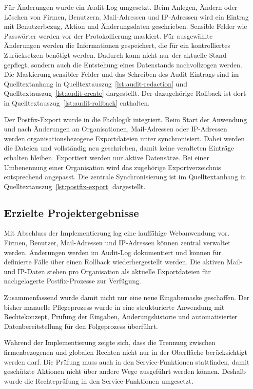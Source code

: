 Für Änderungen wurde ein Audit-Log umgesetzt. Beim Anlegen, Ändern
oder Löschen von Firmen, Benutzern, Mail-Adressen und IP-Adressen wird ein
Eintrag mit Benutzerbezug, Aktion und Änderungsdaten geschrieben. Sensible
Felder wie Passwörter werden vor der Protokollierung maskiert. Für ausgewählte
Änderungen werden die Informationen gespeichert, die für ein
kontrolliertes Zurücksetzen benötigt werden. Dadurch kann nicht nur der aktuelle
Stand gepflegt, sondern auch die Entstehung eines Datenstands nachvollzogen
werden. Die Maskierung sensibler Felder und das Schreiben des Audit-Eintrags
sind im Quelltextanhang  in
Quelltextauszug~\ref{lst:audit-redaction} und
Quelltextauszug~\ref{lst:audit-create} dargestellt. Der dazugehörige Rollback
ist dort in Quelltextauszug~\ref{lst:audit-rollback} enthalten.

Der Postfix-Export wurde in die Fachlogik integriert. Beim Start der Anwendung
und nach Änderungen an Organisationen, Mail-Adressen oder
IP-Adressen werden organisationsbezogene Exportdateien unter
 synchronisiert. Dabei werden die Dateien
 und  vollständig neu
geschrieben, damit keine veralteten Einträge erhalten bleiben. Exportiert
werden nur aktive Datensätze. Bei einer Umbenennung einer Organisation wird das
zugehörige Exportverzeichnis entsprechend angepasst. Die zentrale
Synchronisierung ist im Quelltextanhang  in
Quelltextauszug~\ref{lst:postfix-export} dargestellt.

\subsection{Erzielte Projektergebnisse}
\label{sec:ErzielteProjektergebnisse}
Mit Abschluss der Implementierung lag eine lauffähige Webanwendung vor.
Firmen, Benutzer,
Mail-Adressen und IP-Adressen können zentral verwaltet werden. Änderungen
werden im Audit-Log dokumentiert und können für definierte Fälle über einen
Rollback wiederhergestellt werden. Die aktiven Mail- und IP-Daten stehen pro
Organisation als aktuelle Exportdateien für nachgelagerte Postfix-Prozesse zur
Verfügung.

Zusammenfassend wurde damit nicht nur eine neue Eingabemaske geschaffen. Der
bisher manuelle Pflegeprozess wurde in eine strukturierte Anwendung mit
Rechtekonzept, Prüfung der Eingaben, Änderungshistorie und automatisierter
Datenbereitstellung für den Folgeprozess überführt.

Während der Implementierung zeigte sich, dass die Trennung zwischen
firmenbezogenen und globalen Rechten nicht nur in der Oberfläche
berücksichtigt werden darf. Die Prüfung muss auch in den Service-Funktionen
stattfinden, damit geschützte Aktionen nicht über andere Wege ausgeführt werden
können. Deshalb wurde die Rechteprüfung in den Service-Funktionen umgesetzt.
